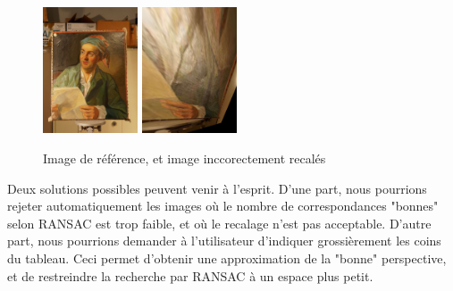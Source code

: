 \documentclass[12pt,a4paper]{article}
\begin{document}
\begin{figure}[H]
  \centering
  \includegraphics[width=0.25\textwidth]{Fig/error_reference.png}
  \includegraphics[width=0.25\textwidth]{Fig/error_fitted.png}
  \caption{Image de référence, et image inccorectement recalés}
\end{figure}

Deux solutions possibles peuvent venir à l'esprit. D'une part, nous pourrions rejeter automatiquement les images où le nombre de correspondances "bonnes" selon RANSAC est trop faible, et où le recalage n'est pas acceptable. D'autre part, nous pourrions demander à l'utilisateur d'indiquer grossièrement les coins du tableau. Ceci permet d'obtenir une approximation de la "bonne" perspective, et de restreindre la recherche par RANSAC à un espace plus petit.
\end{document}
